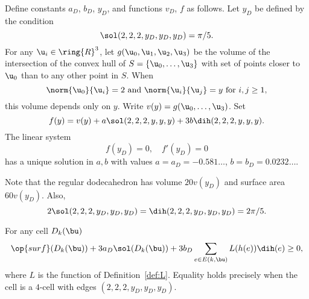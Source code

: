 \begin{definition}[$a_D$,~$b_D$,~$y_D$,~$v_D$,~$f$]
  Define constants $a_D$, $b_D$, $y_D$, and functions $v_D$, $f$ as
  follows.  Let $y_D$ be defined by the condition
\begin{displaymath}
\sol(2,2,2,y_D,y_D,y_D) = \pi/5.
\end{displaymath}
For any $\u_i\in\ring{R}^3$, let $g(\u_0,\u_1,\u_2,\u_3)$ be the
volume of the intersection of the convex hull of
$S=\{\u_0,\ldots,\u_3\}$ with set of points closer to $ \u_0$ than to
any other point in $S$.  When
\begin{equation}\label{eqn:uy}
  \norm{\u_0}{\u_i}=2\text{ and }\norm{ \u_i}{ \u_j} = y\text{ for }i,j\ge 1,
\end{equation} 
this volume depends only on $y$. Write $v(y) = g(\u_0,\ldots,\u_3)$.
Set
\begin{displaymath}
  f(y) = v(y) + a \sol(2,2,2,y,y,y) + 3 b \dih(2,2,2,y,y,y).
\end{displaymath}
The linear system
\begin{equation}\label{eqn:fyD}
f(y_D) = 0,\quad f'(y_D) = 0
\end{equation}
has a unique solution in $a,b$ with values $a=a_D=-0.581\ldots$,
$b=b_D=0.0232\ldots$.
\end{definition}
%
%
%
%
%
%

Note that the regular dodecahedron has volume $20 v(y_D)$ and surface
area $60 v(y_D)$.  Also,
\begin{equation}
  2\sol(2,2,2,y_D,y_D,y_D) =\dih(2,2,2,y_D,y_D,y_D)=2\pi/5.
\end{equation}
%
%

\begin{lemma}\label{lemma:D-local}
For any cell $D_k(\bu)$
\begin{displaymath}
  \op{surf}(D_k(\bu)) + 3 a_D \sol(D_k(\bu)) 
+ 3 b_D \sum_{e\in E(k,\bu)} L(h(e)) \dih(e) \ge 0,
\end{displaymath}
where $L$ is the function of Definition~\ref{def:L}.  Equality holds
precisely when the cell is a $4$-cell with edges
$(2,2,2,y_D,y_D,y_D)$.
\end{lemma}
%

